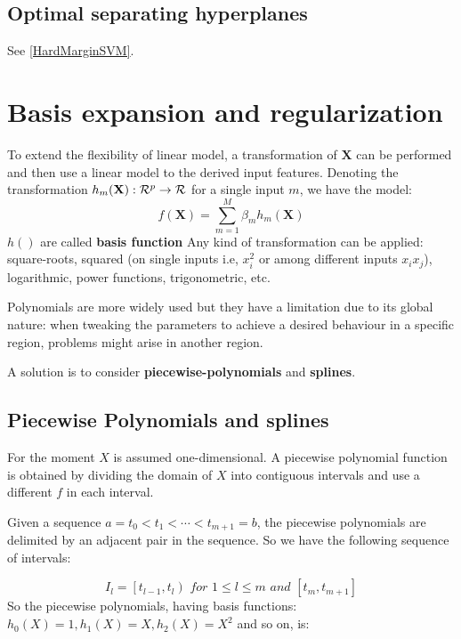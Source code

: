 \documentclass[12pt, letterpaper]{article}
\theoremstyle{definition}
\newcommand{\X}{\mathrm{\mathbf{X}}}
\begin{document}
\subsection{Optimal separating hyperplanes}
\label{OSH}
See \ref{HardMarginSVM}.

\newpage
\section{Basis expansion and regularization}
To extend the flexibility of linear model, a transformation of $\X$ can be performed and then use a linear model to the derived input features. Denoting the transformation $h_m(\X) : \CMcal{R}^p\rightarrow \CMcal	{R}$ for a single input $m$, we have the model:
\begin{equation}
f(\X) = \sum_{m=1}^M \beta_mh_m(\X)
\end{equation}
$h()$ are called \textbf{basis function}
Any kind of transformation can be applied: square-roots, squared (on single inputs i.e, $x_i^2$ or among different inputs $x_ix_j$), logarithmic, power functions, trigonometric, etc. 

Polynomials are more widely used but they have a limitation due to its global nature: when tweaking the  parameters to achieve a desired behaviour in a specific region, problems might arise in another region.

A solution is to consider \textbf{piecewise-polynomials} and \textbf{splines}.

\subsection{Piecewise Polynomials and splines}
For the moment $X$ is assumed one-dimensional. A piecewise polynomial function is obtained by  dividing the domain of $X$ into contiguous intervals and use a different $f$ in each interval.

Given a sequence $a=t_0<t_1<\cdots<t_{m+1}=b$, the piecewise polynomials are delimited by an adjacent pair in the sequence. So we have the following sequence of intervals:

\begin{equation}
I_l = \left[ t_{l-1}, t_l\right) \textit{ for } 1\le l\le m \textit{ and } \left[t_m, t_{m+1}\right]
\end{equation}
So the piecewise polynomials, having basis functions: $h_0(X) = 1, h_1(X) = X, h_2(X) = X^2$ and so on, is:
\end{document}
